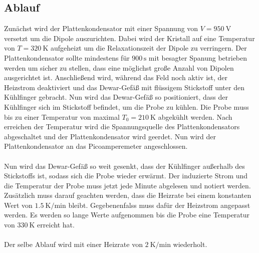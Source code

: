 \subsection{Ablauf}
Zunächst wird der Plattenkondensator mit einer Spannung von $V = \SI{950}{\V}$ versetzt um die Dipole auszurichten.
Dabei wird der Kristall auf eine Temperatur von $T = \SI{320}{\K}$ aufgeheizt um die Relaxationszeit der Dipole zu verringern.
Der Plattenkondensator sollte mindestens für $900\,\si{\second}$ mit besagter Spanung betrieben werden um sicher zu stellen, dass eine möglichst große Anzahl von Dipolen ausgerichtet ist.
Anschließend wird, während das Feld noch aktiv ist, der Heizstrom deaktiviert und das Dewar-Gefäß mit flüssigem Stickstoff unter den Kühlfinger gebracht.
Nun wird das Dewar-Gefäß so positioniert, dass der Kühlfinger sich im Stickstoff befindet, um die Probe zu kühlen.
Die Probe muss bis zu einer Temperatur von maximal $T_0 = \SI{210}{\K}$ abgekühlt werden.
Nach erreichen der Temperatur wird die Spannungsquelle des Plattenkondensators abgeschaltet und der Plattenkondensator wird geerdet.
Nun wird der Plattenkondensator an das Picoamperemeter angeschlossen.
\\\\
Nun wird das Dewar-Gefäß so weit gesenkt, dass der Kühlfinger außerhalb des Stickstoffs ist, sodass sich die Probe wieder erwärmt.
Der induzierte Strom und die Temperatur der Probe muss jetzt jede Minute abgelesen und notiert werden.
Zusätzlich muss darauf geachten werden, dass die Heizrate bei einem konstanten Wert von $\SI{1.5}{\K \per \minute}$ bleibt.
Gegebenenfalss muss dafür der Heizstrom angepasst werden.
Es werden so lange Werte aufgenommen bis die Probe eine Temperatur von $\SI{330}{\K}$ erreicht hat.
\\\\
Der selbe Ablauf wird mit einer Heizrate von $\SI{2}{\K \per \minute}$ wiederholt.
